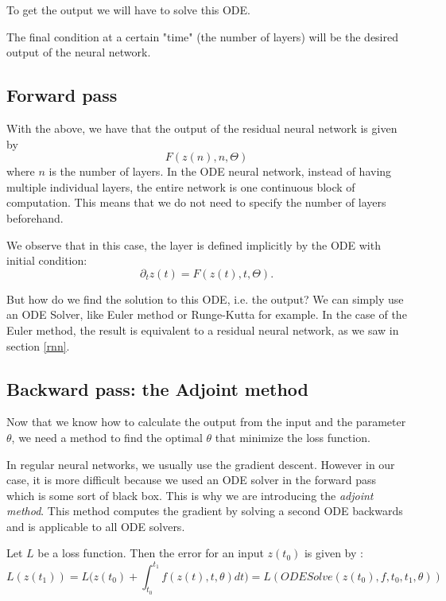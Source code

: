 \documentclass[10pt,a4paper]{article}
\theoremstyle{definition}
\theoremstyle{definition}
\begin{document}
To get the output we will have to solve this ODE.

The final condition at a certain "time" (the number of layers) will be the desired output of the neural network.


\subsection{Forward pass}


With the above, we have that the output of the residual neural network is given by
$$ F(z(n), n, \Theta) $$
where $n$ is the number of layers. 
In the ODE neural network, instead of having multiple individual layers, the entire network is one continuous block of computation. This means that we do not need to specify the number of layers beforehand.

We observe that in this case, the layer is defined implicitly by the ODE with initial condition:
$$ \partial_t z(t) = F(z(t), t, \Theta). $$

But how do we find the solution to this ODE, i.e. the output? We can simply use an ODE Solver, like Euler method or Runge-Kutta for example. In the case of the Euler method, the result is equivalent to a residual neural network, as we saw in section \ref{rnn}.



\subsection{Backward pass: the Adjoint method}
Now that we know how to calculate the output from the input and the parameter $\theta$, we need a method to find the optimal $\theta$ that minimize the loss function.

In regular neural networks, we usually use the gradient descent. However in our case, it is more difficult because we used an ODE solver in the forward pass which is some sort of black box. This is why we are introducing the \textit{adjoint method}. This method computes the gradient by solving a second ODE backwards and is applicable to all ODE solvers.

Let $L$ be a loss function. Then the error for an input $z(t_0)$ is given by :
$$
L(z(t_1)) = L \big( z(t_0) + \int_{t_0}^{t_1} f(z(t),t,\theta) dt \big) = L(ODESolve(z(t_0),f,t_0,t_1,\theta))
$$
\end{document}
